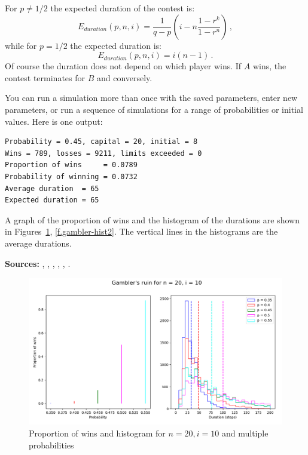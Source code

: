 \documentclass[11pt,a4paper]{article}
\begin{document}
For $p\neq 1/2$ the expected duration of the contest is:
\[
E_{\mathit{duration}}(p,n,i)=\frac{1}{q-p}\left(i-n
\frac{1-r^k}{1-r^n}\right)\,,
\]
while for $p=1/2$ the expected duration is:
\[
E_{\mathit{duration}}(p,n,i)=i(n-1)\,.
\]
Of course the duration does not depend on which player wins. If $A$ wins, the contest terminates for $B$ and conversely.

You can run a simulation more than once with the saved parameters, enter new parameters, or run a sequence of simulations for a range of probabilities or initial values. Here is one output:
\begin{verbatim}
Probability = 0.45, capital = 20, initial = 8
Wins = 789, losses = 9211, limits exceeded = 0
Proportion of wins     = 0.0789
Probability of winning = 0.0732
Average duration  = 65
Expected duration = 65
\end{verbatim}
A graph of the proportion of wins and the histogram of the durations are shown in Figures~\ref{f.gambler-hist1}, \ref{f.gambler-hist2}. The vertical lines in the histograms are the average durations.

\textbf{Sources:} \cite[Chapter 2]{privault}, \cite[Problems 35, 36]{mosteller,mos}, \cite[Example 4m]{ross}, \cite[Example 2.7.3]{BW}, \cite[Section~16.16]{border}, \cite[Section~20.1]{mit-mcs}.

\begin{figure}
\begin{center}
\includegraphics[width=\textwidth]{gamblers-ruin-01}
\caption{Proportion of wins and histogram for $n=20, i=10$ and multiple probabilities}\label{f.gambler-hist1}
\end{center}
\end{figure}
\end{document}
